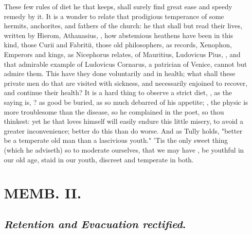 {These few rules of diet he that keeps, shall surely find great ease and speedy remedy by it. It is a wonder to relate that prodigious temperance of some hermits, anchorites, and fathers of the church: he that shall but read their lives, written by Hierom, Athanasius, \etc{}, how abstemious heathens have been in this kind, those Curii and Fabritii, those old philosophers, as \Pliny{} records,  Xenophon,  Emperors and kings, as Nicephorus relates,  of Mauritius, Ludovicus Pius, \etc{}, and that admirable example of Ludovicus Cornarus, a patrician of Venice, cannot but admire them. This have they done voluntarily and in health; what shall these private men do that are visited with sickness, and necessarily enjoined to recover, and continue their health? It is a hard thing to observe a strict diet, , as the saying is, ? as good be buried, as so much debarred of his appetite; , the physic is more troublesome than the disease, so he complained in the poet, so thou thinkest: yet he that loves himself will easily endure this little misery, to avoid a greater inconvenience;  better do this than do worse. And as Tully holds, "better be a temperate old man than a lascivious youth." 'Tis the only sweet thing (which he adviseth) so to moderate ourselves, that we may have , be youthful in our old age, staid in our youth, discreet and temperate in both.

\chapter{ MEMB. II.}

\section{\emph{Retention and Evacuation rectified}.}

}
